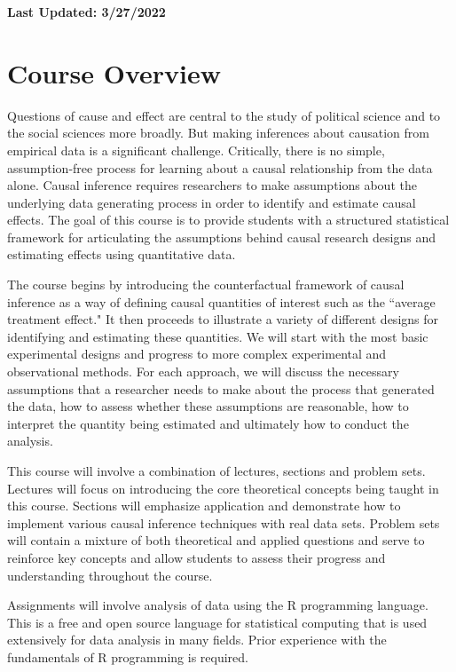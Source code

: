 \documentclass[11pt, article, oneside]{memoir}
\title{{\mytitle}}
\author{\myauthor\smallskip\footnotesize\newline Office: Pick Hall 328, 3rd floor
  \newline Office Hours: Tuesdays 1pm-3pm or schedule an appointment by e-mail \newline
    \myemail \newline \mywebsite
\newline \newline
Teaching Assistant: Arthur Yu\newline
Office Hours: 10:30am-12:30am Fridays \newline
\texttt{\href{mailto:arthurzeyangyu@uchicago.edu}{arthurzeyangyu@uchicago.edu}}
}
\date{}
\theoremstyle{Assumption}
\begin{document}
\maketitle
\textbf{Last Updated: 3/27/2022}
\section*{Course Overview}

Questions of cause and effect are central to the study of political science and to the social sciences more broadly. But making inferences about causation from empirical data is a significant challenge. Critically, there is no simple, assumption-free process for learning about a causal relationship from the data alone. Causal inference requires researchers to make assumptions about the underlying data generating process in order to identify and estimate causal effects. The goal of this course is to provide students with a structured statistical framework for articulating the assumptions behind causal research designs and estimating effects using quantitative data. 

The course begins by introducing the counterfactual framework of causal inference as a way of defining causal quantities of interest such as the ``average treatment effect." It then proceeds to illustrate a variety of different designs for identifying and estimating these quantities. We will start with the most basic experimental designs and progress to more complex experimental and observational methods. For each approach, we will discuss the necessary assumptions that a researcher needs to make about the process that generated the data, how to assess whether these assumptions are reasonable, how to interpret the quantity being estimated and ultimately how to conduct the analysis. 

This course will involve a combination of lectures, sections and problem sets. Lectures will focus on introducing the core theoretical concepts being taught in this course. Sections will emphasize application and demonstrate how to implement various causal inference techniques with real data sets. Problem sets will contain a mixture of both theoretical and applied questions and serve to reinforce key concepts and allow students to assess their progress and understanding throughout the course.

Assignments will involve analysis of data using the R programming language. This is a free and open source language for statistical computing that is used extensively for data analysis in many fields. Prior experience with the fundamentals of R programming is required.
\end{document}
